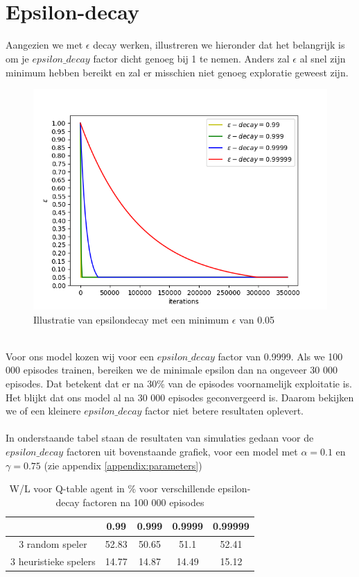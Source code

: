 \documentclass[11pt]{article}
\begin{document}
\section{\\Epsilon-decay}
\label{appendix:epsilon}
Aangezien we met $\epsilon$ decay werken, illustreren we hieronder dat het belangrijk is om je $epsilon\_decay$ factor dicht genoeg bij 1 te nemen. Anders zal $\epsilon$ al snel zijn minimum hebben bereikt en zal er misschien niet genoeg exploratie geweest zijn.\\
\begin{figure}[h]
\centering
\includegraphics[scale=0.65]{images/epsilon_decay.png}
\caption{Illustratie van epsilondecay met een minimum $\epsilon$ van 0.05}
\end{figure}\\
Voor ons model kozen wij voor een $epsilon\_decay$ factor van 0.9999. Als we 100 000 episodes trainen, bereiken we de minimale epsilon dan na ongeveer 30 000 episodes. Dat betekent dat er na 30\% van de episodes voornamelijk exploitatie is. Het blijkt dat ons model al na 30 000 episodes geconvergeerd is. Daarom bekijken we of een kleinere $epsilon\_decay$ factor niet betere resultaten oplevert.\\\\
In onderstaande tabel staan de resultaten van simulaties gedaan voor de $epsilon\_decay$ factoren uit bovenstaande grafiek, voor een model met $\alpha = 0.1$ en $\gamma = 0.75$ (zie appendix \ref{appendix:parameters})
\begin{table}[H]
        \centering
        \begin{tabular}{|c|c|c|c|c|}
                \hline
                                & 0.99&0.999&0.9999&0.99999\\
                                \hline
                3 random speler  &52.83&50.65&51.1&52.41\\
                3 heuristieke spelers      &14.77&14.87&14.49&15.12\\
                \hline
        \end{tabular}
        \caption{W/L voor Q-table agent in \% voor verschillende epsilon-decay factoren na 100 000 episodes}
\end{table}
\end{document}
